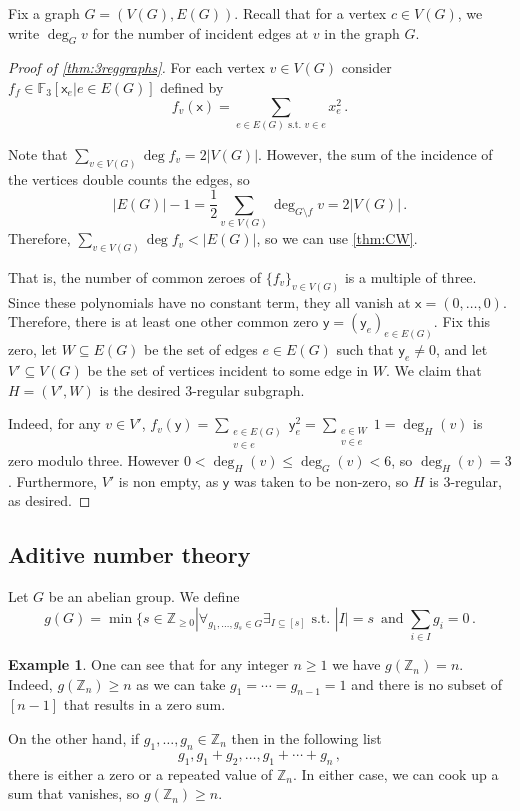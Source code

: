 \documentclass[12pt]{amsart}
\theoremstyle{definition}
\newtheorem{smpl}[thm]{Example}
\newcommand{\Z}{\mathbb{Z}}
\newcommand{\F}{\mathbb{F}}
\newcommand{\vx}{\mathsf{x}}
\newcommand{\vy}{\mathsf{y}}
\begin{document}
Fix a graph $G = (V(G), E(G))$.
Recall that for a vertex $c\in V(G)$, we write $\deg_G v$ for the number of incident edges at $v$ in the graph $G$.

\begin{proof}[Proof of \cref{thm:3reggraphs}]
For each vertex $v\in V(G)$ consider $f_f \in \F_3[\vx_e | e\in E(G) ]$ defined by
$$f_v(\vx) = \sum_{e\in E(G) \text{ s.t. } v\in e} x_e^2 \, . $$

Note that $\sum_{v \in V(G)} \deg f_v = 2 |V(G)|$.
However, the sum of the incidence of the vertices double counts the edges, so
$$ |E(G)| - 1 = \frac{1}{2} \sum_{v \in V(G)} \deg_{G \setminus f} v = 2 |V(G)| \, . $$
Therefore, $\sum_{v \in V(G)} \deg f_v < |E(G)|$, so we can use \cref{thm:CW}.


That is, the number of common zeroes of $\{f_v\}_{v \in V(G)}$ is a multiple of three.
Since these polynomials have no constant term, they all vanish at $\vx = (0, \ldots, 0)$.
Therefore, there is at least one other common zero $\vy = (\vy_e)_{e \in E(G)}$.
Fix this zero, let $W \subseteq E(G)$ be the set of edges $e \in E(G)$ such that $\vy_e \neq 0$, and let $V' \subseteq V(G)$ be the set of vertices incident to some edge in $W$.
We claim that $H = (V', W)$ is the desired $3$-regular subgraph.

Indeed, for any $v \in V'$, $f_v(\vy) = \sum_{\substack{e\in E(G) \\ v \in e}} \vy_e^2 = \sum_{\substack{e\in W \\ v \in e}} 1 = \deg_H(v)$ is zero modulo three.
However $0 < \deg_H(v) \leq \deg_G(v) < 6$, so $\deg_H (v) = 3$.
Furthermore, $V'$ is non empty, as $\vy $ was taken to be non-zero, so $H$ is $3$-regular, as desired.
\end{proof}

\subsection{Aditive number theory}

Let $G$ be an abelian group.
We define 
$$g(G) = \min \{ s \in \Z_{\geq 0} | \forall_{g_1, \ldots, g_s \in G} \exists_{I \subseteq [s]} \text{ s.t. } |I| = s \, \text{ and } \sum_{i \in I} g_i = 0 \, . $$

\begin{smpl}
One can see that for any integer $n \geq 1 $ we have $g(\Z_n) = n$.
Indeed, $g(\Z_n ) \geq n$ as we can take $g_1 = \cdots = g_{n-1} = 1$ and there is no subset of $[n-1]$ that results in a zero sum.

On the other hand, if $g_1, \ldots, g_n \in \Z_n $ then in the following list
$$ g_1, g_1 + g_2, \ldots, g_1 + \cdots + g_n \, , $$
there is either a zero or a repeated value of $\Z_n$.
In either case, we can cook up a sum that vanishes, so $g(\Z_n) \geq n$.
\end{smpl}
\end{document}
